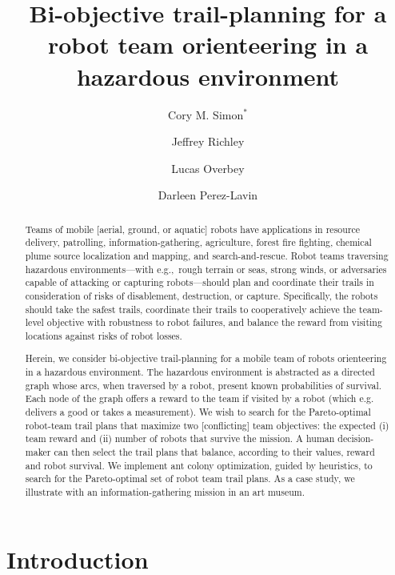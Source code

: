 \documentclass[11pt, oneside]{article}
\title{
Bi-objective trail-planning for a robot team orienteering in a hazardous environment
}
\author[1]{Cory M. Simon$^*$}
\author[2]{Jeffrey Richley}
\author[2]{Lucas Overbey}
\author[2]{Darleen Perez-Lavin}
\affil[1]{School of Chemical, Biological, and Environmental Engineering. Oregon State University. Corvallis, OR. USA.}
\affil[$^*$]{\texttt{cory.simon@oregonstate.edu}}
\affil[2]{Naval Information Warfare Center Atlantic. Charleston, SC. USA.}
\begin{document}
\maketitle

\begin{abstract}
Teams of mobile [aerial, ground, or aquatic] robots have applications in resource delivery, patrolling, information-gathering, agriculture, forest fire fighting, chemical plume source localization and mapping, and search-and-rescue.
Robot teams traversing hazardous environments---with e.g.,\ rough terrain or seas, strong winds, or adversaries capable of attacking or capturing robots---should plan and coordinate their trails in consideration of risks of disablement, destruction, or capture.
Specifically, the robots should take the safest trails, coordinate their trails to cooperatively achieve the team-level objective with robustness to robot failures, and balance the reward from visiting locations against risks of robot losses.

Herein, we consider bi-objective trail-planning for a mobile team of robots orienteering in a hazardous environment.
The hazardous environment is abstracted as a directed graph whose arcs, when traversed by a robot, present known probabilities of survival.
Each node of the graph offers a reward to the team if visited by a robot (which e.g. delivers a good or takes a measurement).
We wish to search for the Pareto-optimal robot-team trail plans that maximize two [conflicting] team objectives: the expected (i) team reward and (ii) number of robots that survive the mission. 
A human decision-maker can then select the trail plans that balance, according to their values, reward and robot survival.
We implement ant colony optimization, guided by heuristics, to search for the Pareto-optimal set of robot team trail plans. 
As a case study, we illustrate with an information-gathering mission in an art museum.

\end{abstract}

\clearpage


\section{Introduction}
\end{document}
